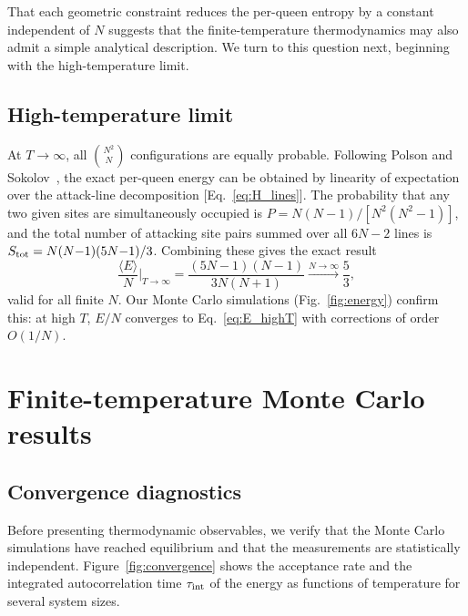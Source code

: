 \documentclass[aps, pre, reprint, amsmath, amssymb, superscriptaddress, floatfix]{revtex4-2}
\begin{document}
That each geometric constraint reduces the per-queen entropy by a
constant independent of $N$ suggests that the finite-temperature
thermodynamics may also admit a simple analytical description.  We
turn to this question next, beginning with the high-temperature limit.

\subsection{High-temperature limit}
\label{sec:highT}

At $T \to \infty$, all $\binom{N^2}{N}$ configurations are equally
probable.  Following Polson and Sokolov~\cite{Polson2024}, the exact
per-queen energy can be obtained by linearity of expectation over the
attack-line decomposition [Eq.~\eqref{eq:H_lines}].  The probability
that any two given sites are simultaneously occupied is
$P = N(N{-}1)/[N^2(N^2{-}1)]$, and the total number of attacking
site pairs summed over all $6N{-}2$ lines is
$S_{\rm tot} = N(N{-}1)(5N{-}1)/3$.  Combining these gives the exact
result
\begin{equation}
  \frac{\langle E \rangle}{N}\bigg|_{T \to \infty}
  = \frac{(5N-1)(N-1)}{3N(N+1)}
  \xrightarrow{N \to \infty} \frac{5}{3},
  \label{eq:E_highT}
\end{equation}
valid for all finite $N$.  Our Monte Carlo simulations
(Fig.~\ref{fig:energy}) confirm this: at high $T$, $E/N$ converges to
Eq.~\eqref{eq:E_highT} with corrections of order $O(1/N)$.


\section{Finite-temperature Monte Carlo results}
\label{sec:mc}

\subsection{Convergence diagnostics}

Before presenting thermodynamic observables, we verify that the
Monte Carlo simulations have reached equilibrium and that the
measurements are statistically independent.
Figure~\ref{fig:convergence} shows the acceptance rate and the
integrated autocorrelation time $\tau_{\rm int}$ of the energy as
functions of temperature for several system sizes.
\end{document}
